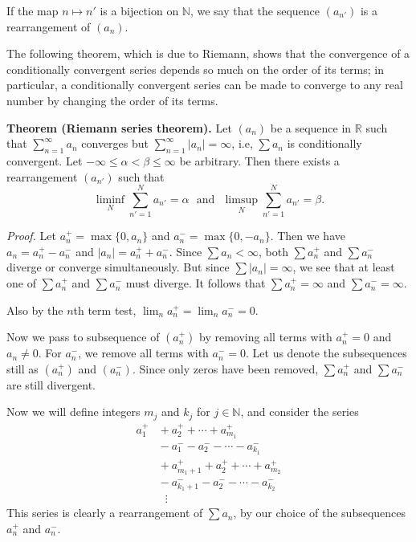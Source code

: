 \documentclass[12pt]{article}
\begin{document}

If the map $n \mapsto n'$ is a bijection on $\mathbb{N}$, we say that the sequence $(a_{n'})$ is a rearrangement of $(a_{n})$. 

The following theorem, which is due to Riemann, shows that the convergence of a conditionally convergent series depends so much on the order of its terms; in particular, a conditionally convergent series can be made to converge to any real number by changing the order of its terms. 

\textbf{Theorem (Riemann series theorem).}
Let $(a_n)$ be a sequence in $\mathbb{R}$  such that $\sum_{n=1}^\infty a_n$ converges but $\sum_{n=1}^\infty |a_n| = \infty$, i.e, $\sum a_n$ is conditionally convergent.   Let $-\infty\leq \alpha < \beta \leq \infty $ be arbitrary. Then there exists a rearrangement $(a_{n'})$  such that 
$$
\liminf_N \sum_{n'=1}^N a_{n'} = \alpha \ \ \ \mbox{and} \ \ \  \limsup_N \sum_{n'=1}^N a_{n'} = \beta.
$$


{\em Proof.}
Let $a_n^+ = \max\{0,a_n\}$ and $a_n^- = \max\{0,-a_n\}$.  Then we have $a_n = a_n^+ - a_n^-$ and $|a_n| = a_n^+ + a_n^-$.  Since $\sum a_n < \infty$, both $\sum a_n^+$ and $\sum a_n^-$ diverge or converge simultaneously. But since $\sum|a_n|=\infty$, we see that at least one of $\sum a_n^+$ and $\sum a_n^-$ must diverge.  It follows that  $\sum a_n^+ = \infty$ and $\sum a_n^- = \infty$.

Also by the $n$th term test, $\lim_n a_n^+ = \lim_n a_n^- = 0$. 

Now we pass to subsequence of $(a_n^+)$ by removing all terms with $a_n^+ = 0$ and $a_n \neq 0$.  For $a_n^-$, we remove all terms with $a_n^- = 0$.   Let us denote the subsequences still as $(a_n^+)$ and $(a_n^-)$.  Since only zeros have been removed, $\sum a_n^+$ and $\sum a_n^-$ are still divergent.

Now we will define integers $m_j$ and $k_j$ for $j\in\mathbb{N}$, and consider the series
\begin{align*}
a^+_1 & {}+ a^+_2 + \cdots + a^+_{m_1}\\
&{}- a^-_1 - a^-_2 - \cdots - a^-_{k_1}\\
&{} + a^+_{m_1+1}  + a^+_2 + \cdots + a^+_{m_2}\\
&{}- a^-_{k_1+1} - a^-_2 - \cdots - a^-_{k_2} \\
& \ \ \ \vdots 
\end{align*}
This series is clearly a rearrangement of $\sum a_n$, by our choice of the subsequences $a^+_n$ and $a^-_n$.  
\end{document}
